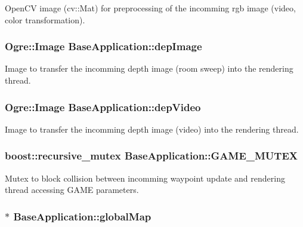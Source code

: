 \-Open\-C\-V image (cv\-::\-Mat) for preprocessing of the incomming rgb image (video, color transformation). \hypertarget{classBaseApplication_a0b2012a7ec70e1b7583b89f40c657320}{
\subsubsection[{dep\-Image}]{\setlength{\rightskip}{0pt plus 5cm}\-Ogre\-::\-Image {\bf \-Base\-Application\-::dep\-Image}}}\label{classBaseApplication_a0b2012a7ec70e1b7583b89f40c657320}
\-Image to transfer the incomming depth image (room sweep) into the rendering thread. \hypertarget{classBaseApplication_a5851500faacd7d3792ce7a6f6184888e}{
\subsubsection[{dep\-Video}]{\setlength{\rightskip}{0pt plus 5cm}\-Ogre\-::\-Image {\bf \-Base\-Application\-::dep\-Video}}}\label{classBaseApplication_a5851500faacd7d3792ce7a6f6184888e}
\-Image to transfer the incomming depth image (video) into the rendering thread. \hypertarget{classBaseApplication_a2b3c5be6607bdf48ac909bafe48d3a89}{
\subsubsection[{\-G\-A\-M\-E\-\_\-\-M\-U\-T\-E\-X}]{\setlength{\rightskip}{0pt plus 5cm}boost\-::recursive\-\_\-mutex {\bf \-Base\-Application\-::\-G\-A\-M\-E\-\_\-\-M\-U\-T\-E\-X}}}\label{classBaseApplication_a2b3c5be6607bdf48ac909bafe48d3a89}
\-Mutex to block collision between incomming waypoint update and rendering thread accessing \-G\-A\-M\-E parameters. \hypertarget{classBaseApplication_a2f5e751177a5e6d87593fa208ea7ffa3}{
\subsubsection[{global\-Map}]{$\ast$ {\bf \-Base\-Application\-::global\-Map}}}\label{classBaseApplication_a2f5e751177a5e6d87593fa208ea7ffa3}
